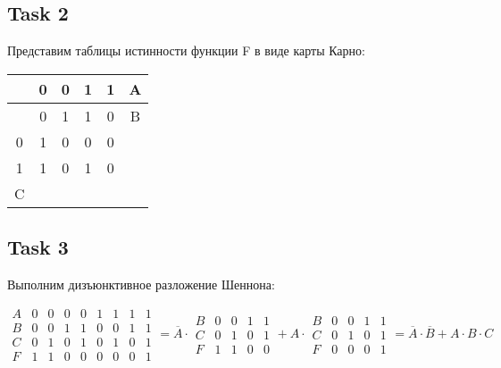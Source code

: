 \documentclass[a4paper,10pt]{article} %
\begin{document}
	\subsection{Task 2}
	
	Представим таблицы истинности функции F в виде карты Карно:
	
	\begin{tabular}{|c|c|c|c|c|c|}
		\hline 
		& 0 & 0 & 1 & 1 & A \\ 
		\hline 
		& 0 & 1 & 1 & 0 & B \\ 
		\hline 
		0 & 1 & 0 & 0 & 0 &  \\ 
		\hline 
		1 & 1 & 0 & 1 & 0 &  \\ 
		\hline 
		C &  &  &  &  &  \\ 
		\hline 
	\end{tabular} 

	\subsection{Task 3}
	
	Выполним дизъюнктивное разложение Шеннона:
	
	\begin{equation}
		\begin{smallmatrix}
			A & 0 & 0 & 0 & 0 & 1 & 1 & 1 & 1 \\
			B & 0 & 0 & 1 & 1 & 0 & 0 & 1 & 1 \\
			C & 0 & 1 & 0 & 1 & 0 & 1 & 0 & 1 \\
			F & 1 & 1 & 0 & 0 & 0 & 0 & 0 & 1
		\end{smallmatrix}
		= 
		\overline{A} \cdot 
		\begin{smallmatrix}
			B & 0 & 0 & 1 & 1 \\
			C & 0 & 1 & 0 & 1 \\
			F & 1 & 1 & 0 & 0
		\end{smallmatrix} 
		+ 
		A \cdot
		\begin{smallmatrix}
			B & 0 & 0 & 1 & 1 \\
			C & 0 & 1 & 0 & 1 \\
			F & 0 & 0 & 0 & 1
		\end{smallmatrix}
		= \overline{A} \cdot \overline{B} + A \cdot B \cdot C
	\end{equation}
	
\end{document}
